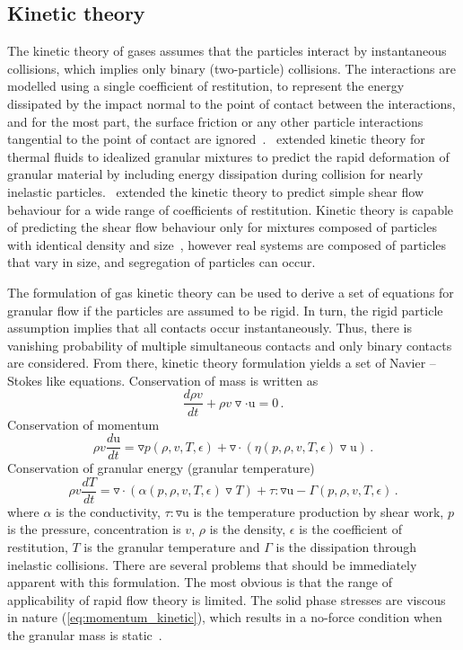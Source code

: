 \subsection{Kinetic theory}
The kinetic theory of gases assumes that the particles interact by 
instantaneous collisions, which implies only binary (two-particle) collisions. 
The interactions 
are modelled using a single coefficient of restitution, to represent the energy 
dissipated by the impact normal to the point of contact between the 
interactions, 
and for the most part, the surface friction or any other particle interactions 
tangential to the point of contact are 
ignored~\citep{Campbell1990}.~\citet{Jenkins1983} extended kinetic theory 
for thermal fluids to idealized granular mixtures to predict the rapid 
deformation of granular material by including energy dissipation during 
collision for nearly inelastic particles.~\citet{Savage1981} extended the 
kinetic theory to predict simple shear flow behaviour for a wide range of 
coefficients of restitution. Kinetic theory is capable of predicting the 
shear flow behaviour only for mixtures composed of particles with identical 
density and size~\citep{Iddir2005}, however real systems are composed of 
particles that vary in size, and segregation of particles can occur. 

The formulation of gas kinetic theory can be used to derive a
set of equations for granular flow if the particles are assumed to
be rigid. In turn, the rigid particle assumption implies that all contacts 
occur instantaneously. Thus, there is vanishing probability of multiple 
simultaneous contacts and only binary contacts are considered. From there, 
kinetic theory formulation yields a set of Navier – Stokes like equations. 
Conservation of mass is written as
\begin{equation}
\frac{d \rho v}{dt} + \rho v \triangledown \cdot \mathrm{u} = 0 \,.
\end{equation}
\noindent Conservation of momentum
\begin{equation}
\label{eq:momentum_kinetic}
\rho v \frac{d \mathrm{u}}{dt} = \triangledown p(\rho,v,T,\epsilon) + 
\triangledown \cdot ( \eta (p,\rho,v,T,\epsilon)  \triangledown \mathrm{u}) \,.
\end{equation}
\noindent Conservation of granular energy (granular temperature)
\begin{equation}
\rho v \frac{d T}{dt} = \triangledown \cdot ( \alpha (p,\rho,v,T,\epsilon)  
\triangledown T) + \tau : \triangledown \mathrm{u} - \Gamma 
(p,\rho,v,T,\epsilon)  \,.
\end{equation}
where $\alpha$ is the conductivity, $\tau : \triangledown \mathrm{u}$ is the 
temperature production by shear work, $p$ is the pressure, concentration is 
$v$, $\rho$ is the density, $\epsilon$ is the coefficient of restitution, $T$ 
is the granular temperature and $\Gamma$ is the dissipation through inelastic 
collisions. There are several problems that should be immediately
apparent with this formulation. The most obvious is that the
range of applicability of rapid flow theory is limited. The solid phase 
stresses are viscous in nature (\cref{eq:momentum_kinetic}), which results in 
a no-force condition when the granular mass is static~\citep{Campbell2006}.


